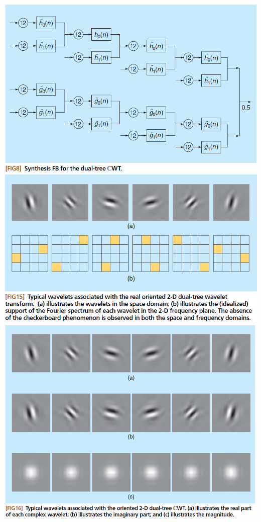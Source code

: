 \documentclass[11pt]{article} %
\begin{document}
\includegraphics[width=\textwidth]{dt_synthesis_fb}
\includegraphics[width=\textwidth]{complex_dt_wav}
\includegraphics[width=\textwidth]{complex_oriented_wav}
\end{document}
